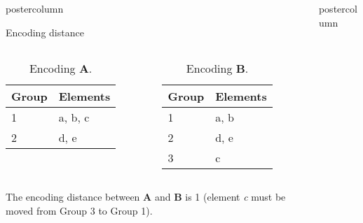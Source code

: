 \documentclass[final]{beamer}\usepackage[]{graphicx}\usepackage[]{color}
\newlength{\columnheight}
\begin{document}
\begin{frame}
\begin{columns}
\begin{column}{.49\textwidth}
\begin{beamercolorbox}[center,wd=\textwidth]{postercolumn}
\begin{minipage}[T]{.95\textwidth}
{\begin{block}{Encoding distance}
\begin{columns}
\begin{table}[ht]
\centering
\begin{tabular}{ll}
  \hline
Group & Elements \\ 
  \hline
1 & a, b, c \\ 
  2 & d, e \\ 
   \hline
\end{tabular}
\caption{Encoding \textbf{A}.} 
\end{table}


\begin{table}[ht]
\centering
\begin{tabular}{ll}
  \hline
Group & Elements \\ 
  \hline
1 & a, b \\ 
  2 & d, e \\ 
  3 & c \\ 
   \hline
\end{tabular}
\caption{Encoding \textbf{B}.} 
\end{table}

\end{columns}

The encoding distance between \textbf{A} and \textbf{B} is 1 (element \textit{c} must be moved from Group 3 to Group 1).

\end{block}
\vfill



}
\end{minipage}
\end{beamercolorbox}
\end{column}



\begin{column}{.49\textwidth}
\begin{beamercolorbox}[center,wd=\textwidth]{postercolumn}
\begin{minipage}[T]{.95\textwidth}  
\parbox[t][\columnheight]{\textwidth}
{




}
\end{minipage}
\end{beamercolorbox}
\end{column}
\end{columns}
\end{frame}
\end{document}

